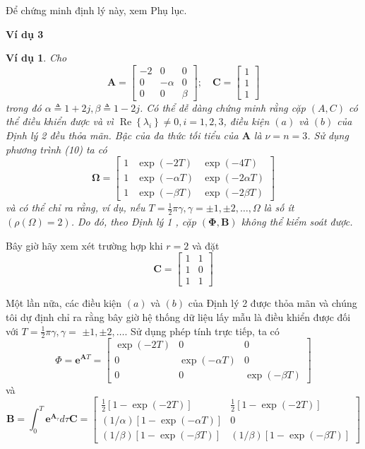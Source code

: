 \documentclass[12pt,a4paper]{article}
\newtheorem{vd}{Ví dụ}
\begin{document}
Để chứng minh định lý này, xem Phụ lục.


\textbf{Ví dụ 3}

\begin{vd}
	Cho
	$$
	\mathbf{A}=\left[\begin{array}{rrr}
		-2 & 0 & 0 \\
		0 & -\alpha & 0 \\
		0 & 0 & \beta
	\end{array}\right] ; \quad \mathbf{C}=\left[\begin{array}{l}
		1 \\
		1 \\
		1
	\end{array}\right]
	$$
	trong đó $\alpha \triangleq 1+2 j, \beta \triangleq 1-2 j$. Có thể dễ dàng chứng minh rằng cặp $(A, C)$ có thể điều khiển được và vì $\operatorname{Re}\left\{\lambda_i\right\} \neq 0, i=1,2,3$, điều kiện $(a )$ và $(b)$ của Định lý 2 đều thỏa mãn. Bậc của đa thức tối tiểu của $\mathbf{A}$ là $\nu=n=3$. Sử dụng phương trình (10) ta có
	$$
	\boldsymbol{\Omega}=\left[\begin{array}{lll}
		1 & \exp (-2 T) & \exp (-4 T) \\
		1 & \exp (-\alpha T) & \exp (-2 \alpha T) \\
		1 & \exp (-\beta T) & \exp (-2 \beta T)
	\end{array}\right]
	$$
	và có thể chỉ ra rằng, ví dụ, nếu $T=\frac{1}{2} \pi \gamma, \gamma= \pm 1, \pm 2, \ldots, \Omega$ là số ít $(\rho (\Omega)=2)$. Do đó, theo Định lý 1 , cặp $(\boldsymbol{\Phi}, \mathbf{B})$ không thể kiểm soát được. 
\end{vd}



Bây giờ hãy xem xét trường hợp khi $r=2$ và đặt
$$
\mathbf{C}=\left[\begin{array}{ll}
	1 & 1 \\
	1 & 0 \\
	1 & 1
\end{array}\right]
$$

Một lần nữa, các điều kiện $(a)$ và $(b)$ của Định lý 2 được thỏa mãn và chúng tôi dự định chỉ ra rằng bây giờ hệ thống dữ liệu lấy mẫu là điều khiển được đối với $T=\frac{1}{2} \pi \gamma, \gamma=$ $\pm 1, \pm 2, \ldots$. Sử dụng phép tính trực tiếp, ta có
$$
\Phi=\mathbf{e}^{\mathbf{A} T}=\left[\begin{array}{ccc}
	\exp (-2 T) & 0 & 0 \\
	0 & \exp (-\alpha T) & 0 \\
	0 & 0 & \exp (-\beta T)
\end{array}\right]
$$
và
$$
\mathbf{B}=\int_0^T \mathbf{e}^{\mathbf{A}_\tau} d \tau \mathbf{C}=\left[\begin{array}{cc}
	\frac{1}{2}[1-\exp (-2 T)] & \frac{1}{2}[1-\exp (-2 T)] \\
	(1 / \alpha)[1-\exp (-\alpha T)] & 0 \\
	(1 / \beta)[1-\exp (-\beta T)] & (1 / \beta)[1-\exp (-\beta T)]
\end{array}\right]
$$
\end{document}
